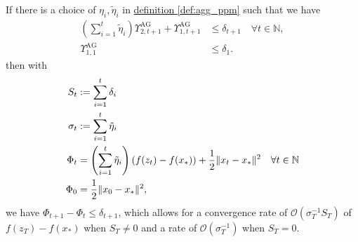 \documentclass[12pt]{article}
\begin{document}
        \begin{theorem}
        \label{thm:generic_ag_convergence}
            If there is a choice of $\eta_i, \tilde \eta_i$ in \hyperref[def:agg_ppm]{definition \ref*{def:agg_ppm}} such that we have 
            \begin{align*}
                \left(
                    \sum_{i = 1}^{t} \tilde \eta_i
                \right)
                \Upsilon_{2, t + 1}^{\text{AG}} + 
                \Upsilon_{1, t + 1}^{\text{AG}} 
                &\le \delta_{t + 1} \quad 
                \forall t \in \mathbb N, 
                \\
                \Upsilon_{1, 1}^{\text{AG}} &\le \delta_1. 
            \end{align*}
            then with 
            \begin{align*}
                S_t &:= \sum_{i = 1}^{t} \delta_i
                \\
                \sigma_t &:= \sum_{i = 1}^{t}\tilde \eta_i
                \\
                \Phi_t &= \left(
                    \sum_{i = 1}^{t} \tilde\eta_{i}
                \right) (f(z_t) - f(x_*)) + \frac{1}{2}\Vert x_t - x_*\Vert^2 \quad \forall t \in \mathbb N
                \\
                \Phi_0 &= \frac{1}{2}\Vert x_0 - x_*\Vert^2, 
            \end{align*}
            we have $\Phi_{t + 1} - \Phi_t \le \delta_{t + 1}$, which allows for a convergence rate of $\mathcal O \left(\sigma_T^{-1}S_T\right)$ of $f(z_T) - f(x_*)$ when $S_T \neq 0$ and a rate of $\mathcal O(\sigma_T^{-1})$ when $S_T = 0$. 
        \end{theorem}
\end{document}
